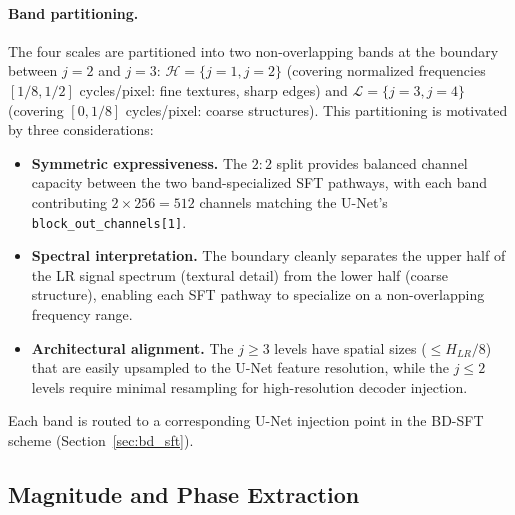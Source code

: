\paragraph{Band partitioning.}
The four scales are partitioned into two non-overlapping bands at 
the boundary between $j=2$ and $j=3$: $\mathcal{H} = \{j{=}1, 
j{=}2\}$ (covering normalized frequencies $[1/8, 1/2]$ 
cycles/pixel: fine textures, sharp edges) and $\mathcal{L} = 
\{j{=}3, j{=}4\}$ (covering $[0, 1/8]$ cycles/pixel: coarse 
structures). This partitioning is motivated by three 
considerations:
\begin{itemize}
    \item \textbf{Symmetric expressiveness.} The $2{:}2$ split 
    provides balanced channel capacity between the two 
    band-specialized SFT pathways, with each band contributing 
    $2 \times 256 = 512$ channels matching the U-Net's 
    \texttt{block\_out\_channels[1]}.
    \item \textbf{Spectral interpretation.} The boundary cleanly 
    separates the upper half of the LR signal spectrum (textural 
    detail) from the lower half (coarse structure), enabling 
    each SFT pathway to specialize on a non-overlapping frequency 
    range.
    \item \textbf{Architectural alignment.} The $j \ge 3$ levels 
    have spatial sizes ($\le H_{LR}/8$) that are easily upsampled 
    to the U-Net feature resolution, while the $j \le 2$ levels 
    require minimal resampling for high-resolution decoder 
    injection.
\end{itemize}
Each band is routed to a corresponding U-Net injection point in 
the BD-SFT scheme (Section~\ref{sec:bd_sft}).

\subsection{Magnitude and Phase Extraction}
\label{subsec:mag_phase_extraction}

